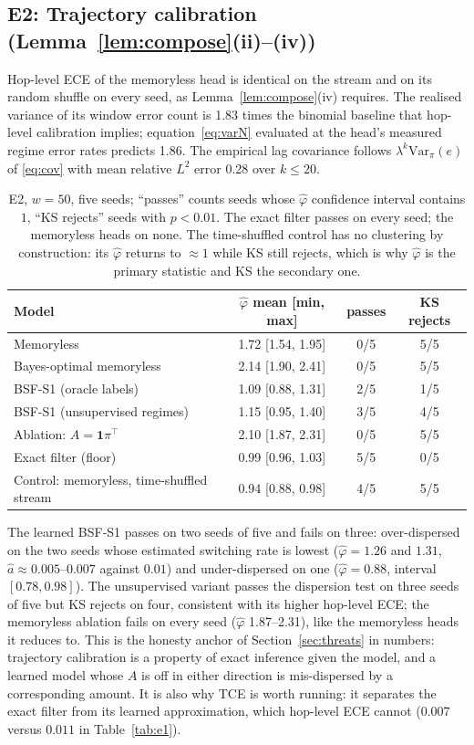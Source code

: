 \documentclass[11pt,a4paper]{article}
\numberwithin{equation}{section}
\theoremstyle{plain}
\theoremstyle{definition}
\theoremstyle{remark}
\newcommand{\Var}{\mathrm{Var}}
\begin{document}
\subsection{E2: Trajectory calibration (Lemma~\ref{lem:compose}(ii)--(iv))}\label{sec:e2}
Hop-level ECE of the memoryless head is identical on the stream and on its random shuffle on every seed, as Lemma~\ref{lem:compose}(iv) requires. The realised variance of its window error count is 1.83 times the binomial baseline that hop-level calibration implies; equation~\eqref{eq:varN} evaluated at the head's measured regime error rates predicts 1.86. The empirical lag covariance follows $\lambda^k\Var_\pi(e)$ of \eqref{eq:cov} with mean relative $L^2$ error 0.28 over $k\le20$.
\begin{table}[h]\centering\small\setlength{\tabcolsep}{4pt}
\begin{tabular}{@{}lccc@{}}\toprule
Model & $\hat\varphi$ mean [min, max] & passes & KS rejects\\\midrule
Memoryless & 1.72 [1.54, 1.95] & 0/5 & 5/5\\
Bayes-optimal memoryless & 2.14 [1.90, 2.41] & 0/5 & 5/5\\
BSF-S1 (oracle labels) & 1.09 [0.88, 1.31] & 2/5 & 1/5\\
BSF-S1 (unsupervised regimes) & 1.15 [0.95, 1.40] & 3/5 & 4/5\\
Ablation: $A=\mathbf 1\pi^\top$ & 2.10 [1.87, 2.31] & 0/5 & 5/5\\
Exact filter (floor) & 0.99 [0.96, 1.03] & 5/5 & 0/5\\
Control: memoryless, time-shuffled stream & 0.94 [0.88, 0.98] & 4/5 & 5/5\\
\bottomrule\end{tabular}
\caption{E2, $w=50$, five seeds; ``passes'' counts seeds whose $\hat\varphi$ confidence interval contains $1$, ``KS rejects'' seeds with $p<0.01$. The exact filter passes on every seed; the memoryless heads on none. The time-shuffled control has no clustering by construction: its $\hat\varphi$ returns to $\approx1$ while KS still rejects, which is why $\hat\varphi$ is the primary statistic and KS the secondary one.}\label{tab:e2}
\end{table}
The learned BSF-S1 passes on two seeds of five and fails on three: over-dispersed on the two seeds whose estimated switching rate is lowest ($\hat\varphi=1.26$ and $1.31$, $\hat a\approx0.005$--$0.007$ against $0.01$) and under-dispersed on one ($\hat\varphi=0.88$, interval $[0.78,0.98]$). The unsupervised variant passes the dispersion test on three seeds of five but KS rejects on four, consistent with its higher hop-level ECE; the memoryless ablation fails on every seed ($\hat\varphi$ 1.87--2.31), like the memoryless heads it reduces to. This is the honesty anchor of Section~\ref{sec:threats} in numbers: trajectory calibration is a property of exact inference given the model, and a learned model whose $A$ is off in either direction is mis-dispersed by a corresponding amount. It is also why TCE is worth running: it separates the exact filter from its learned approximation, which hop-level ECE cannot ($0.007$ versus $0.011$ in Table~\ref{tab:e1}).
\end{document}
